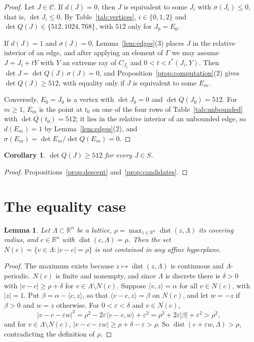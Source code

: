\documentclass[11pt]{amsart}
\newtheorem{lemma}[theorem]{Lemma}
\newtheorem{corollary}[theorem]{Corollary}
\theoremstyle{definition}
\theoremstyle{remark}
\numberwithin{equation}{section}
\numberwithin{table}{section}
\numberwithin{figure}{section}
\newcommand{\R}{\mathbb{R}}
\newcommand{\dist}{\operatorname{dist}}
\newcommand{\cand}{\mathcal{C}}
\begin{document}
\begin{proof}
Let $J\in\cand$. If $d(J)=0$, then $J$ is equivalent to some $J_i$ with $\sigma(J_i)\le0$, that is, $\det J_i\le0$. By Table~\ref{tab:vertices}, $i\in\{0,1,2\}$ and $\det Q(J)\in\{512,1024,768\}$, with $512$ only for $J_0=E_0$.

If $d(J)=1$ and $\sigma(J)=0$, Lemma~\ref{lem:edges}(3) places $J$ in the relative interior of an edge, and after applying an element of $\Gamma$ we may assume $J=J_i+tY$ with $Y$ an extreme ray of $C_{J_i}$ and $0<t<t^*(J_i,Y)$. Then $\det J=\det Q(J)\,\sigma(J)=0$, and Proposition~\ref{prop:computation}(2) gives $\det Q(J)\ge512$, with equality only if $J$ is equivalent to some $E_m$.

Conversely, $E_0=J_0$ is a vertex with $\det J_0=0$ and $\det Q(J_0)=512$. For $m\ge1$, $E_m$ is the point at $t_0$ on one of the four rows of Table~\ref{tab:unbounded} with $\det Q(t_0)=512$; it lies in the relative interior of an unbounded edge, so $d(E_m)=1$ by Lemma~\ref{lem:edges}(2), and $\sigma(E_m)=\det E_m/\det Q(E_m)=0$.
\end{proof}

\begin{corollary}\label{cor:bound}
$\det Q(J)\ge512$ for every $J\in S$.
\end{corollary}

\begin{proof}
Propositions~\ref{prop:descent} and~\ref{prop:candidates}.
\end{proof}

\section{The equality case}\label{sec:equality}

\begin{lemma}\label{lem:deephole}
Let $\Lambda\subset\R^n$ be a lattice, $\rho=\max_{z\in\R^n}\dist(z,\Lambda)$ its covering radius, and $c\in\R^n$ with $\dist(c,\Lambda)=\rho$. Then the set $N(c)=\{v\in\Lambda:|v-c|=\rho\}$ is not contained in any affine hyperplane.
\end{lemma}

\begin{proof}
The maximum exists because $z\mapsto\dist(z,\Lambda)$ is continuous and $\Lambda$-periodic. $N(c)$ is finite and nonempty, and since $\Lambda$ is discrete there is $\delta>0$ with $|v-c|\ge\rho+\delta$ for $v\in\Lambda\setminus N(c)$. Suppose $\langle v,z\rangle=\alpha$ for all $v\in N(c)$, with $|z|=1$. Put $\beta=\alpha-\langle c,z\rangle$, so that $\langle v-c,z\rangle=\beta$ on $N(c)$, and let $w=-z$ if $\beta>0$ and $w=z$ otherwise. For $0<\varepsilon<\delta$ and $v\in N(c)$,
\[
|v-c-\varepsilon w|^2=\rho^2-2\varepsilon\langle v-c,w\rangle+\varepsilon^2=\rho^2+2\varepsilon|\beta|+\varepsilon^2>\rho^2,
\]
and for $v\in\Lambda\setminus N(c)$, $|v-c-\varepsilon w|\ge\rho+\delta-\varepsilon>\rho$. So $\dist(c+\varepsilon w,\Lambda)>\rho$, contradicting the definition of $\rho$.
\end{proof}
\end{document}
